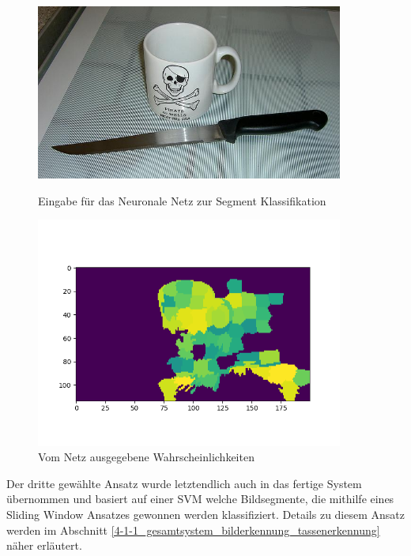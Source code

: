 \begin{figure}
    \centering
    \begin{minipage}{0.45\textwidth}
        \centering
        \includegraphics[width=0.9\textwidth]{images/cup_patches.jpg} %
        \caption{Eingabe für das Neuronale Netz zur Segment Klassifikation \label{fig:patches_prediction}}
    \end{minipage}\hfill
    \begin{minipage}{0.45\textwidth}
        \centering
        \includegraphics[width=0.9\textwidth]{images/cup_patches_prediction.png} %
        \caption{Vom Netz ausgegebene Wahrscheinlichkeiten \label{fig:patches_prediction_result}}
    \end{minipage}
\end{figure}

Der dritte gewählte Ansatz wurde letztendlich auch in das fertige System übernommen und basiert auf einer SVM welche Bildsegmente, die mithilfe eines Sliding Window Ansatzes gewonnen werden klassifiziert. Details zu diesem Ansatz werden im Abschnitt \ref{4-1-1_gesamtsystem_bilderkennung_tassenerkennung} näher erläutert.

